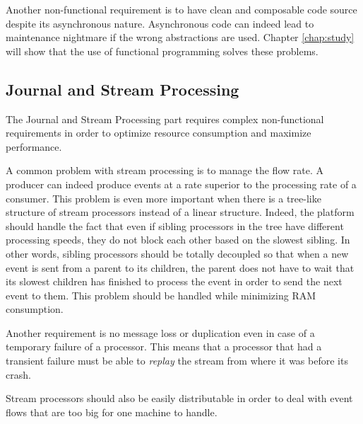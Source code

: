Another non-functional requirement is to have clean and composable code source despite its asynchronous nature. Asynchronous
code can indeed lead to maintenance nightmare if the wrong abstractions are used. Chapter \ref{chap:study} will
show that the use of functional programming solves these problems.

\subsection{Journal and Stream Processing}

The Journal and Stream Processing part requires complex non-functional requirements in order to optimize resource consumption and maximize performance.

A common problem with stream processing is to manage the flow rate. A producer can indeed produce events at a rate superior to
the processing rate of a consumer. This problem is even more important when there is
a tree-like structure of stream processors instead of a linear structure. Indeed, the platform should handle the fact that even if sibling processors in the tree
have different processing speeds, they do not block each other based on the slowest sibling. In other words, sibling processors should be
totally decoupled so that when a new event is sent from a parent to its children, the parent does not have to wait that its slowest
children has finished to process the event in order to send the next event to them. This problem should be handled while minimizing
RAM consumption.

Another requirement is no message loss or duplication even in case of a temporary failure of a processor. This means that a processor
that had a transient failure must be able to \textit{replay} the stream from where it was before its crash.

Stream processors should also be easily distributable in order to deal with event flows that are too big
for one machine to handle.



